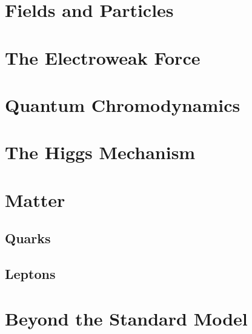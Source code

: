\section{Fields and Particles}
\section{The Electroweak Force}
\section{Quantum Chromodynamics}
\section{The Higgs Mechanism}
\section{Matter}
\subsection{Quarks}
\subsection{Leptons}
\section{Beyond the Standard Model}
